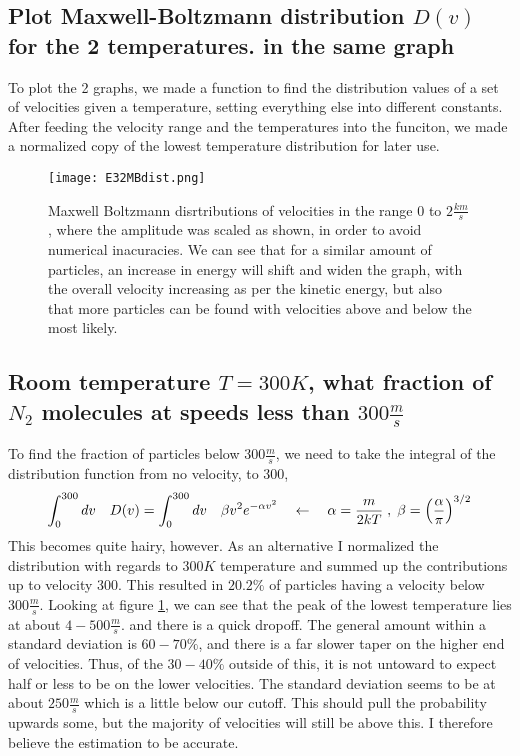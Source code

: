\documentclass[a4paper,11pt]{article}
\begin{document}
\subsection{ Plot Maxwell-Boltzmann distribution $D(v)$ for the 2 temperatures. in the same graph }%

To plot the 2 graphs, we made a function to find the distribution values of a set of velocities given a temperature, setting everything else 
into different constants. After feeding the velocity range and the temperatures into the funciton, we made a normalized copy of the lowest temperature
distribution for later use. 

\begin{figure}[hbtp]
\texttt{[image: E32MBdist.png]}
\caption{Maxwell Boltzmann disrtributions of velocities in the range $0$ to $2\frac{km}{s}$, where the amplitude was scaled as shown,
    in order to avoid numerical inacuracies. We can see that for a similar amount of particles, an increase in energy will shift and widen
    the graph, with the overall velocity increasing as per the kinetic energy, but also that more particles can be found with velocities above
    and below the most likely.}
 \label{Maxwell-Boltzmann}
\end{figure}


\subsection{ Room temperature $T = 300K$, what fraction of $N_2$ molecules at speeds less than $300\frac{m}{s}$ }%

To find the fraction of particles below $300\frac{m}{s}$, we need to take the integral of the distribution function from no velocity, to
$300$, 
\[ \int_0^{300}dv\quad D(v) =  \int_0^{300}dv\quad \beta v^2e^{-\alpha v^2} 
    \quad \leftarrow \quad \alpha = \frac{ m }{ 2kT } \; , \; \beta = \qty( \frac{ \alpha }{ \pi } )^{3/2} \] 
This becomes quite hairy, however. As an alternative I normalized the distribution with regards to $300K$ temperature and summed up the 
contributions up to velocity 300. This resulted in $20.2\%$ of particles having a velocity below $300 \frac{m}{s}$. Looking at 
figure \ref{Maxwell-Boltzmann}, we can see that the peak of the lowest temperature lies at about $4-500 \frac{m}{s}$. and there is a quick dropoff. 
The general amount within a standard deviation is $60 - 70\%$, and there is a far slower taper on the higher end of velocities. Thus, of the 
$30-40\%$ outside of this, it is not untoward to expect half or less to be on the lower velocities. The standard deviation seems to be at about 
$250\frac{m}{s}$ which is a little below our cutoff. This should pull the probability upwards some, but the majority of velocities will still be above
this. I therefore believe the estimation to be accurate. 
\end{document}
